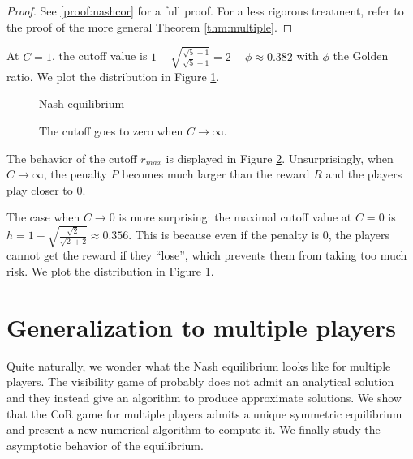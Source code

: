 \documentclass[preprint,12pt,authoryear]{elsarticle}
\theoremstyle{definition}
\begin{document}
\begin{proof}
    See \ref{proof:nashcor} for a full proof. For a less rigorous treatment, refer to the proof of the more general Theorem \ref{thm:multiple}.
\end{proof}

At $C = 1$, the cutoff value is $1 - \sqrt{\frac{\sqrt{5} - 1}{\sqrt{5} + 1}} = 2 - \phi \approx 0.382$ with $\phi$ the Golden ratio. We plot the distribution in Figure \ref{fig:nash}.


\begin{figure}[htbp]
  \centering
  \begin{minipage}[t]{0.48\textwidth}
    \centering
    
  \end{minipage}
  \hfill
  \begin{minipage}[t]{0.48\textwidth}
    \centering
    
  \end{minipage}
  \caption{Nash equilibrium}
  \label{fig:nash}  
\end{figure}


\begin{figure}[htbp]
  \centering
  
  \caption{The cutoff goes to zero when $C \rightarrow\infty$.}
  \label{fig:cutoff}  
\end{figure}


 The behavior of the cutoff ${r_{max}}$ is displayed in Figure \ref{fig:cutoff}. Unsurprisingly, when $C \rightarrow \infty$, the penalty $P$ becomes much larger than the reward $R$ and the players play closer to $0$.

The case when $C \rightarrow 0$ is more surprising: the maximal cutoff value at $C=0$ is $h = 1 - \sqrt{\frac{\sqrt{2}}{\sqrt{2} + 2}} \approx 0.356$. This is because even if the penalty is $0$, the players cannot get the reward if they ``lose'', which prevents them from taking too much risk. We plot the distribution in Figure \ref{fig:nash}. 

\section{Generalization to multiple players}

Quite naturally, we wonder what the Nash equilibrium looks like for multiple players. The visibility game of \citet{Lotker2008-tx} probably does not admit an analytical solution and they instead give an algorithm to produce approximate solutions. We show that the CoR game for multiple players admits a unique symmetric equilibrium and present a new numerical algorithm to compute it. We finally study the asymptotic behavior of the equilibrium. 
\end{document}
